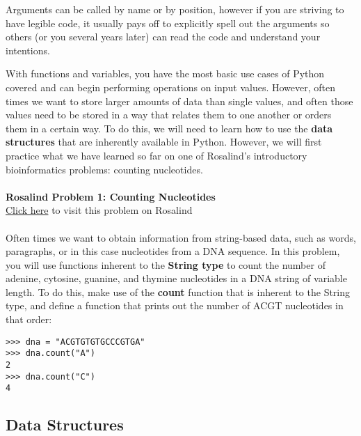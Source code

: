 \documentclass[a4paper,11pt]{article}
\begin{document}
Arguments can be called by name or by position, however if you are striving to have legible code, it 
usually pays off to explicitly spell out the arguments so others (or you several years later) can read 
the code and understand your intentions.  \par
With functions and variables, you have the most basic use cases of Python covered and can begin performing 
operations on input values.  However, often times we want to store larger amounts of data than single values, 
and often those values need to be stored in a way that relates them to one another or orders them in a 
certain way.  To do this, we will need to learn how to use the \textbf{data structures} that are inherently 
available in Python.  However, we will first practice what we have learned so far on one of Rosalind's 
introductory bioinformatics problems: counting nucleotides. \\
\\
\textbf{Rosalind Problem 1: Counting Nucleotides} \\
\href{http://rosalind.info/problems/dna/?class=246}{Click here} to visit this problem on Rosalind \\
\\
Often times we want to obtain information from string-based data, such as words, paragraphs, or in this case 
nucleotides from a DNA sequence.  In this problem, you will use functions inherent to the \textbf{String type} 
to count the number of adenine, cytosine, guanine, and thymine nucleotides in a DNA string of variable length.  
To do this, make use of the \textbf{count} function that is inherent to the String type, and define a function 
that prints out the number of ACGT nucleotides in that order:

\vspace{3mm}
\begin{lstlisting}
>>> dna = "ACGTGTGTGCCCGTGA"
>>> dna.count("A")
2
>>> dna.count("C")
4
\end{lstlisting}
\vspace{3mm}

\pagebreak
\subsection{Data Structures}
\end{document}
